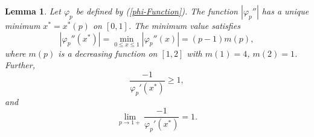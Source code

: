 \documentclass{amsart}
\newtheorem{lem}[theorem]{Lemma}
\numberwithin{equation}{section}
\begin{document}
\begin{lem}
\label{x-p-lem}
Let $\varphi_p$ be defined by (\ref{phi-Function}). The function $|\varphi_p''|$ has a unique minimum $x^*= x^*(p)$ on $[0,1]$. The minimum value satisfies
\begin{equation}
    \label{phi-p2ndDerivMin1}
    |\varphi_p''(x^*)|=\min_{0\le x\le1}|\varphi_p''(x)|=(p-1)m(p),
\end{equation}
where $m(p)$ is a decreasing function on $[1,2]$ with $m(1)=4$, $m(2)=1$. Further,
\begin{equation}
    \label{x-p-lem1}
    \frac{-1}{\varphi_p'(x^*)}\ge1,
\end{equation}
and 
\begin{equation}
    \label{x-p-lem2}
    \lim_{p\rightarrow1+}\frac{-1}{\varphi_p'(x^*)}=1.
\end{equation}
\end{lem}
\end{document}
